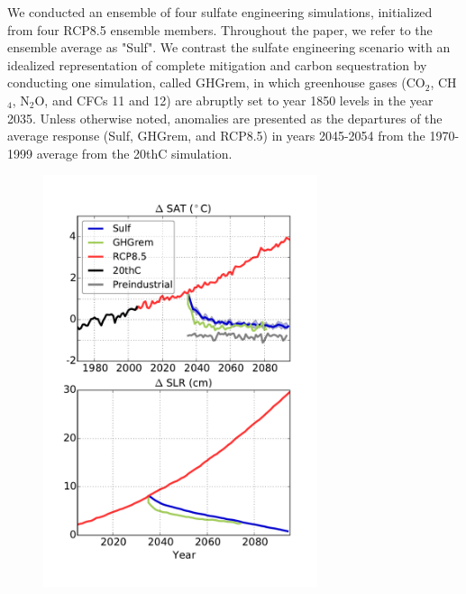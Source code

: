 \documentclass{nature}
\begin{document}
\begin{methods}
We conducted an ensemble of four sulfate engineering simulations, initialized from four RCP8.5 ensemble members. Throughout the paper, we refer to the ensemble average as "Sulf". We contrast the sulfate engineering scenario with an idealized representation of complete mitigation and carbon sequestration by conducting one simulation, called GHGrem, in which greenhouse gases (CO$_2$, CH$_4$, N$_2$O, and CFCs 11 and 12) are abruptly set to year 1850 levels in the year 2035. Unless otherwise noted, anomalies are presented as the departures of the average response (Sulf, GHGrem, and RCP8.5) in years 2045-2054 from the 1970-1999 average from the 20thC simulation.

\end{methods}

\begin{figure}%
\noindent\includegraphics[width=19pc]{figures/SAT_SLR_timeseries_geotimescalesWAISpaper.pdf} %

\end{figure}
\end{document}
